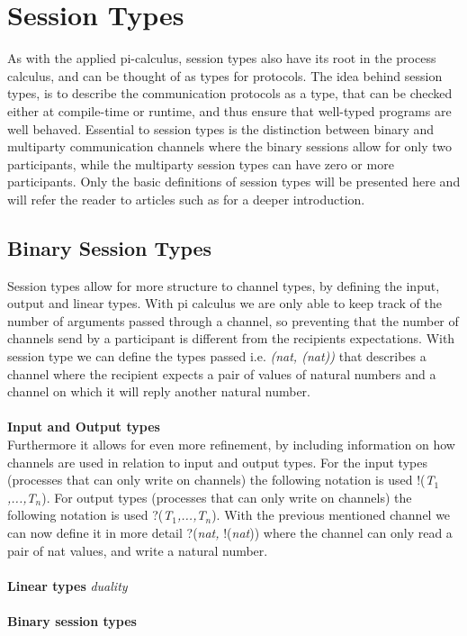 \section{Session Types}
As with the applied pi-calculus, session types also have its root in the process calculus, and can be thought of as types for protocols. The idea behind session types, is to describe the communication protocols as a type, that can be checked either at compile-time or runtime, and thus ensure that well-typed programs are well behaved. Essential to session types is the distinction between binary and multiparty communication channels where the binary sessions allow for only two participants, while the multiparty session types can have zero or more participants. Only the basic definitions of session types will be presented here and will refer the reader to articles such as \citeauthor{DBLP:journals/csur/HuttelLVCCDMPRT16} for a deeper introduction. 

\subsection{Binary Session Types}
Session types allow for more structure to channel types, by defining the input, output and linear types. With pi calculus we are only able to keep track of the number of arguments passed through a channel, so preventing that the number of channels send by a participant is different from the recipients expectations. With session type we can define the types passed i.e. \textit{(nat, (nat))} that describes a channel where the recipient expects a pair of values of natural numbers and a channel on which it will reply another natural number. \\ \\
\textbf{Input and Output types} \\
Furthermore it allows for even more refinement, by including information on how channels are used in relation to input and output types. For the input types (processes that can only write on channels) the following notation is used !(\textit{T$_1$,...,T$_n$}). For output types (processes that can only write on channels) the following notation is used ?(\textit{T$_1$,...,T$_n$}). With the previous mentioned channel we can now define it in more detail ?(\textit{nat, }!(\textit{nat})) where the channel can only read a pair of nat values, and write a natural number. \\ \\
\textbf{Linear types} \textit{duality} \\ \\
\textbf{Binary session types} \\ \\


